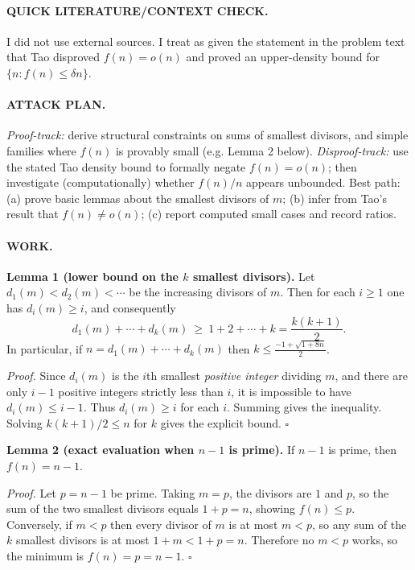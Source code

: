 \paragraph{QUICK LITERATURE/CONTEXT CHECK.}
I did not use external sources. I treat as given the statement in the problem text that Tao disproved $f(n)=o(n)$ and proved an upper-density bound for $\{n:f(n)\le \delta n\}$.

\paragraph{ATTACK PLAN.}
\emph{Proof-track:} derive structural constraints on sums of smallest divisors, and simple families where $f(n)$ is provably small (e.g. Lemma 2 below).
\emph{Disproof-track:} use the stated Tao density bound to formally negate $f(n)=o(n)$; then investigate (computationally) whether $f(n)/n$ appears unbounded.
Best path: (a) prove basic lemmas about the smallest divisors of $m$; (b) infer from Tao's result that $f(n)\neq o(n)$; (c) report computed small cases and record ratios.

\paragraph{WORK.}
\textbf{Lemma 1 (lower bound on the $k$ smallest divisors).}
Let $d_1(m)<d_2(m)<\cdots$ be the increasing divisors of $m$.
Then for each $i\ge 1$ one has $d_i(m)\ge i$, and consequently
\[
d_1(m)+\cdots + d_k(m)\ \ge\ 1+2+\cdots + k = \frac{k(k+1)}{2}.
\]
In particular, if $n=d_1(m)+\cdots+d_k(m)$ then $k\le \frac{-1+\sqrt{1+8n}}{2}$.

\emph{Proof.}
Since $d_i(m)$ is the $i$th smallest \emph{positive integer} dividing $m$, and there are only $i-1$ positive integers strictly less than $i$, it is impossible to have $d_i(m)\le i-1$.
Thus $d_i(m)\ge i$ for each $i$.
Summing gives the inequality.
Solving $k(k+1)/2\le n$ for $k$ gives the explicit bound.
\hfill$\square$

\textbf{Lemma 2 (exact evaluation when $n-1$ is prime).}
If $n-1$ is prime, then $f(n)=n-1$.

\emph{Proof.}
Let $p=n-1$ be prime. Taking $m=p$, the divisors are $1$ and $p$, so the sum of the two smallest divisors equals $1+p=n$, showing $f(n)\le p$.
Conversely, if $m<p$ then every divisor of $m$ is at most $m<p$, so any sum of the $k$ smallest divisors is at most $1+m < 1+p=n$.
Therefore no $m<p$ works, so the minimum is $f(n)=p=n-1$.
\hfill$\square$

